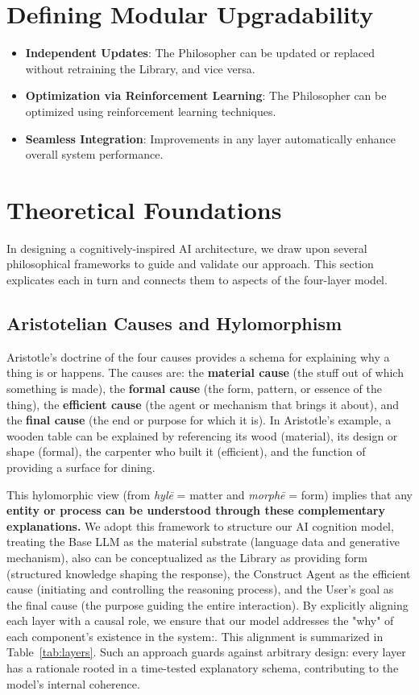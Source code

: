 \documentclass{article}
\begin{document}
\hrulefill{}

\section{Defining Modular Upgradability}
\begin{itemize}
  \item \textbf{Independent Updates}: The Philosopher can be updated or replaced without retraining the Library, and vice versa.
  \item \textbf{Optimization via Reinforcement Learning}: The Philosopher can be optimized using reinforcement learning techniques.
  \item \textbf{Seamless Integration}: Improvements in any layer automatically enhance overall system performance.
\end{itemize}

\hrulefill{}

\section{Theoretical Foundations}\label{sec:foundations}
In designing a cognitively-inspired AI architecture, we draw upon several philosophical frameworks to guide and validate our approach. This section explicates each in turn and connects them to aspects of the four-layer model.

\subsection{Aristotelian Causes and Hylomorphism}
Aristotle's doctrine of the four causes provides a schema for explaining why a thing is or happens. The causes are: the \textbf{material cause} (the stuff out of which something is made), the \textbf{formal cause} (the form, pattern, or essence of the thing), the \textbf{efficient cause} (the agent or mechanism that brings it about), and the \textbf{final cause} (the end or purpose for which it is). In Aristotle's example, a wooden table can be explained by referencing its wood (material), its design or shape (formal), the carpenter who built it (efficient), and the function of providing a surface for dining. 

This hylomorphic view (from \emph{hylē} = matter and \emph{morphē} = form) implies that any \textbf{entity or process can be understood through these complementary explanations.} We adopt this framework to structure our AI cognition model, treating the Base LLM as the material substrate (language data and generative mechanism), also can be conceptualized as the Library as providing form (structured knowledge shaping the response), the Construct Agent as the efficient cause (initiating and controlling the reasoning process), and the User's goal as the final cause (the purpose guiding the entire interaction). By explicitly aligning each layer with a causal role, we ensure that our model addresses the "why" of each component's existence in the system:. This alignment is summarized in Table~\ref{tab:layers}. Such an approach guards against arbitrary design: every layer has a rationale rooted in a time-tested explanatory schema, contributing to the model's internal coherence.
\end{document}
